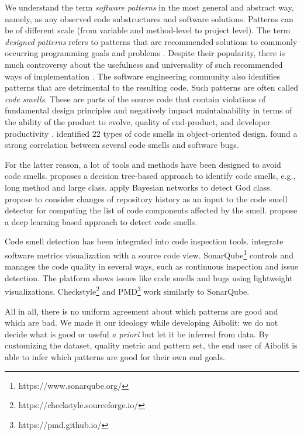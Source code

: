 We understand the term \textit{software patterns} in the most general and
abstract way, namely, as any observed code substructures and software solutions.
Patterns can be of different scale (from variable and method-level to project
level). The term \textit{designed patterns} refers to patterns that are
recommended solutions to commonly occurring programming goals and problems
\citep{gamma1995design}. Despite their popularity, there is much controversy about the
usefulness and universality of such recommended ways of implementation
\citep{mcconnell2004code}. The software engineering community
also identifies patterns that are detrimental to the resulting code. Such
patterns are often called \textit{code smells}. These are parts of the
source code that contain violations of  fundamental design principles
and negatively impact maintainability in terms of the
ability of the product to evolve, quality  of end-product, and developer
productivity \citet{Reeshti2019MeasuringCS}. \citet{Din2012AntipatternsDA}
identified 22 types of  code smells in object-oriented
design. \citet{Kessentini2019UnderstandingTC} found a strong correlation between
several code smells and software bugs.

For the latter reason, a lot of tools and methods have been designed to avoid
code smells. \citet{Kreimer2005AdaptiveDO}  proposes a decision tree-based
approach to identify code smells, e.g., long method and large class.
\citet{Vaucher2009TrackingDS} apply Bayesian  networks to detect God class.
\citet{Palomba2015MiningVH} propose  to consider changes of repository history
as an input to the code smell detector  for computing the list of code
components affected by the smell. \citet{Liu2019DeepLB} propose a deep learning
based approach  to detect code smells.

Code smell detection has been integrated into code inspection tools.
\citet{MurphyHill2010AnIA} integrate software metrics  visualization with a
source code view.  SonarQube\footnote{https://www.sonarqube.org/} controls and
manages  the code quality in several ways, such as continuous  inspection and
issue detection. The platform shows issues like code smells and bugs using
lightweight visualizations.
Checkstyle\footnote{https://checkstyle.sourceforge.io/} and
PMD\footnote{https://pmd.github.io/}  work similarly to SonarQube.


All in all, there is no uniform agreement about which patterns are good and
which are bad. We made it our ideology while developing Aibolit: we do not
decide what is good or useful \textit{a priori} but let it be inferred from
data. By customizing the dataset, quality metric and pattern set, the end user
of Aibolit is able to infer which patterns are good for their own end goals.
